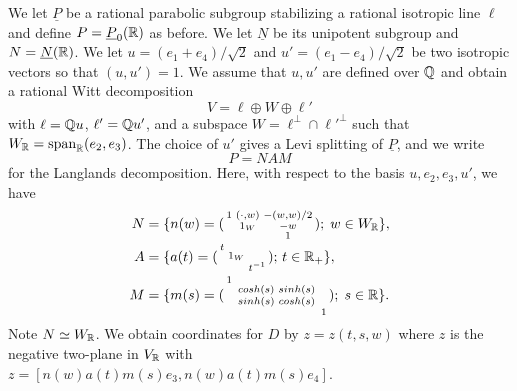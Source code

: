 We let  $\underline{P}$ be a rational parabolic subgroup stabilizing a rational isotropic line $\ell$ and define $P= \underline{P}_0(\mathbb{R})$ as before. We let $\underline{N}$ be its unipotent subgroup and $N = \underline{N}(\mathbb{R})$. 
We let $u =(e_1+e_4)/\sqrt{2}$ and $u' =(e_1-e_4)/\sqrt{2}$ be two isotropic vectors so that $(u,u')=1$. We assume that $u,u'$ are defined over $\mathbb{Q}$ and obtain a rational Witt decomposition 
\[
V = \ell \oplus W \oplus \ell'
\]
with $\ell = \mathbb{Q} u$, $\ell'=\mathbb{Q} u'$, and a subspace $W = \ell^{\perp} \cap {\ell'}^{\perp}$ such that $W_{\mathbb{R}} = \operatorname{span}_{\mathbb{R}}(e_2,e_3)$. The choice of $u'$ gives a Levi splitting of $\underline{P}$, and we write
\[
P =NAM
\]
for the Langlands decomposition. Here, with respect to the basis $u,e_2,e_3,u'$, we have  
\begin{align*}
{N} &=
 \{ n(w)   = ( 
\begin{smallmatrix}
1&(\cdot,w)& -(w,w)/2 \\
 &   1_W   & -w  \\
 &         & 1  \\
\end{smallmatrix} )
; \; w \in W_{\mathbb{R}} \}, \\ 
{A} &= \{ a(t) = 
( \begin{smallmatrix}
t& &  \\
 &   1_W   &  \\
 &         & t^{-1}\\
\end{smallmatrix} ); \, t \in \mathbb{R}_+
 \}, \\ 
{M} & =
\{ m(s)  =
( \begin{smallmatrix}
1& & \\
 &    \begin{smallmatrix} cosh(s) & sinh(s) \\ sinh(s) & cosh(s)
 \end{smallmatrix}    & \\\
 &         & 1  \\
\end{smallmatrix} )
; \; s \in \mathbb{R} \}.
\end{align*}
Note $N \simeq W_{\mathbb{R}}$. We obtain coordinates for $D$ by $z=z(t,s,w)$ where $z$ is the negative two-plane in $V_{\mathbb{R}}$ with $z=[n(w)a(t)m(s)e_3,n(w)a(t)m(s)e_4]$. 

